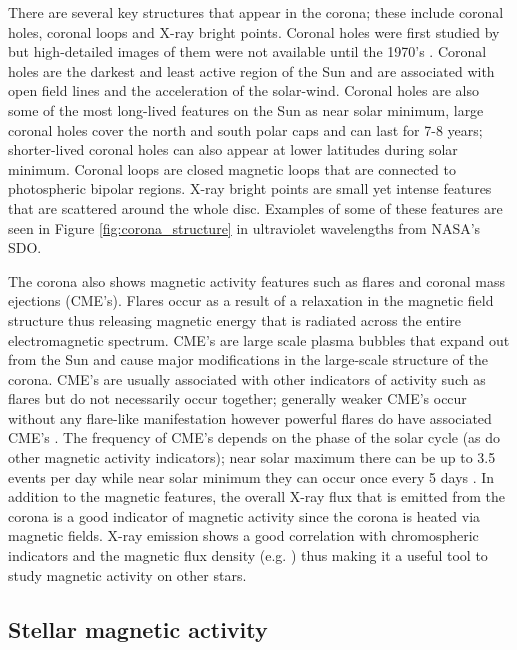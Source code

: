 There are several key structures that appear in the corona; these include coronal holes, coronal loops and X-ray bright points. Coronal holes were first studied by \citet{Waldmeier_1956} but high-detailed images of them were not available until the 1970's \citep{Huber_etal_1974}. Coronal holes are the darkest and least active region of the Sun and are associated with open field lines and the acceleration of the solar-wind. Coronal holes are also some of the most long-lived features on the Sun as near solar minimum, large coronal holes cover the north and south polar caps and can last for 7-8 years; shorter-lived coronal holes can also appear at lower latitudes during solar minimum. Coronal loops are closed magnetic loops that are connected to photospheric bipolar regions. X-ray bright points are small yet intense features that are scattered around the whole disc. Examples of some of these features are seen in Figure \ref{fig:corona_structure} in ultraviolet wavelengths from NASA's SDO.

The corona also shows magnetic activity features such as flares and coronal mass ejections (CME's). Flares occur as a result of a relaxation in the magnetic field structure thus releasing magnetic energy that is radiated across the entire electromagnetic spectrum. CME's are large scale plasma bubbles that expand out from the Sun and cause major modifications in the large-scale structure of the corona. CME's are usually associated with other indicators of activity such as flares but do not necessarily occur together; generally weaker CME's occur without any flare-like manifestation however powerful flares do have associated CME's \citep{Andrews_2003}. The frequency of CME's depends on the phase of the solar cycle (as do other magnetic activity indicators); near solar maximum there can be up to 3.5 events per day while near solar minimum they can occur once every 5 days \citep{Carroll_Ostlie_2006}. In addition to the magnetic features, the overall X-ray flux that is emitted from the corona is a good indicator of magnetic activity since the corona is heated via magnetic fields. X-ray emission shows a good correlation with chromospheric indicators and the magnetic flux density (e.g. \citealt{Schrijver_etal_1992,Pevtsov_etal_2003}) thus making it a useful tool to study magnetic activity on other stars.

\subsection{Stellar magnetic activity}

